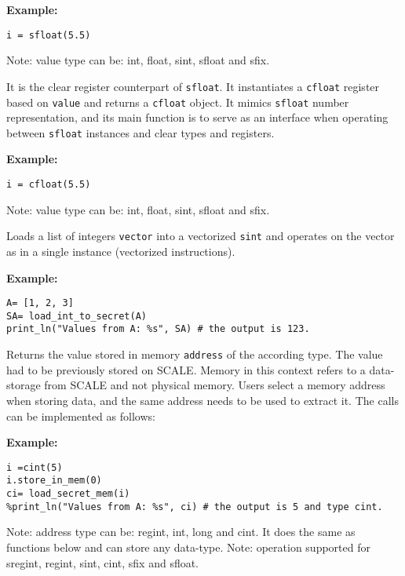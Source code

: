 \noindent
\textbf{Example:}
\begin{lstlisting}
i = sfloat(5.5)
\end{lstlisting}
\begin{footnotesize}
  Note: value type can be: int, float, sint, sfloat and sfix.
\end{footnotesize}

It is the clear register counterpart of \verb|sfloat|.
It instantiates a \verb|cfloat| register based on \verb|value| and returns a \verb|cfloat| object.
It mimics \verb|sfloat| number representation,
and its main function is to serve as an interface when operating
between \verb|sfloat| instances and clear types and registers.

\noindent
\textbf{Example:}
\begin{lstlisting}
i = cfloat(5.5)
\end{lstlisting}
\begin{footnotesize}
  Note: value type can be: int, float, sint, sfloat and sfix.
\end{footnotesize}

Loads a list of integers \verb|vector| into a vectorized \verb|sint| and operates on the vector as in a single instance (vectorized instructions).

\noindent
\textbf{Example:}
\begin{lstlisting}
A= [1, 2, 3]
SA= load_int_to_secret(A)
print_ln("Values from A: %s", SA) # the output is 123.
\end{lstlisting}

Returns the value stored in memory \verb|address| of the according type. The value had to be previously stored on SCALE. Memory in this context refers to a data-storage from SCALE and not physical memory. Users select a memory address when storing data, and the same address needs to be used to extract it. The calls can be implemented as follows:

\noindent
\textbf{Example:}
\begin{lstlisting}
i =cint(5)
i.store_in_mem(0)
ci= load_secret_mem(i)
%print_ln("Values from A: %s", ci) # the output is 5 and type cint.
\end{lstlisting}
\begin{footnotesize}
  Note: address type can be: regint, int, long and cint. It does the same as functions below and can store any data-type.
  Note: operation supported for sregint, regint, sint, cint, sfix and sfloat.
\end{footnotesize}

